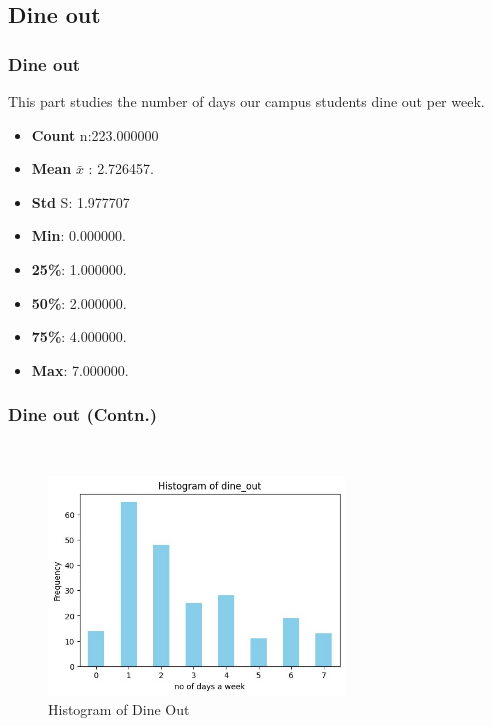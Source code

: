 \documentclass{beamer}
\begin{document}

\subsection{Dine out }
\begin{frame}
\frametitle{Dine out}
    This part studies the number of days our campus students dine out per week. 
    \begin{block}{}
        \begin{itemize}
            \item \textbf{Count} n:223.000000
            \item \textbf{Mean} $\bar{x}$ : 2.726457.
            \item \textbf{Std} S: 1.977707
            \item \textbf{Min}: 0.000000.
            \item \textbf{25\%}: 1.000000.
            \item \textbf{50\%}: 2.000000.
            \item \textbf{75\%}: 4.000000.
            \item \textbf{Max}: 7.000000.
        \end{itemize}
    \end{block}
     
\end{frame}
\begin{frame}
    \frametitle{Dine out (Contn.) }\
    \begin{figure}
    \centering
    \includegraphics[width=0.7\textwidth]{Histogram of Dine Out.jpg} %
    \caption{Histogram of Dine Out } %
    \label{fig:Histogram of Dine Out } %
    \end{figure}
\end{frame}
\end{document}
